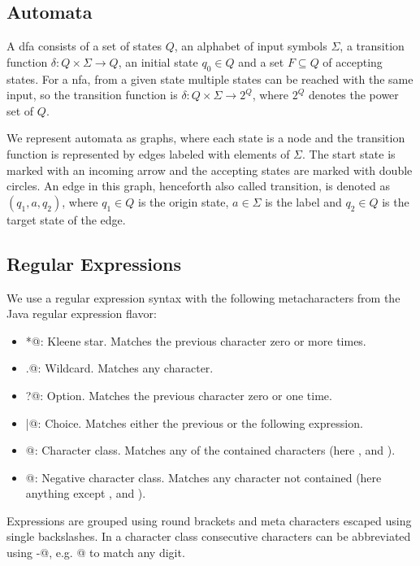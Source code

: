 \subsection{Automata}

A \acf{dfa} consists of a set of states $Q$, an alphabet of input symbols $\Sigma$, a transition function $\delta: Q \times \Sigma \rightarrow Q$, an initial state $q_0 \in Q$ and a set $F \subseteq Q$ of accepting states.
For a \acf{nfa}, from a given state multiple states can be reached with the same input, so the transition function is  $\delta: Q \times \Sigma \rightarrow 2^Q$, where $2^Q$ denotes the power set of $Q$.

We represent automata as graphs, where each state is a node and the transition function is represented by edges labeled with elements of $\Sigma$. The start state is marked with an incoming arrow and the accepting states are marked with double circles.
An edge in this graph, henceforth also called transition, is denoted as $(q_1, a, q_2)$, where $q_1 \in Q$ is the origin state, $a \in \Sigma$ is the label and $q_2 \in Q$ is the target state of the edge.

\subsection{Regular Expressions}

We use a regular expression syntax with the following metacharacters from the Java regular expression flavor:

\begin{itemize}
	\item \Verb@*@: Kleene star. Matches the previous character zero or more times.
	\item \Verb@.@: Wildcard. Matches any character.
	\item \Verb@?@: Option. Matches the previous character zero or one time.
	\item \Verb@|@: Choice. Matches either the previous or the following expression.
	\item \Verb@[abc]@: Character class. Matches any of the contained characters (here \Verb@a@, \Verb@b@ and \Verb@c@).
	\item \Verb@[^abc]@: Negative character class. Matches any character not contained (here anything except \Verb@a@, \Verb@b@ and \Verb@c@).
\end{itemize}

Expressions are grouped using round brackets and meta characters escaped using single backslashes.
In a character class consecutive characters can be abbreviated using \Verb@-@, e.g. \Verb@[0-9]@ to match any digit.

